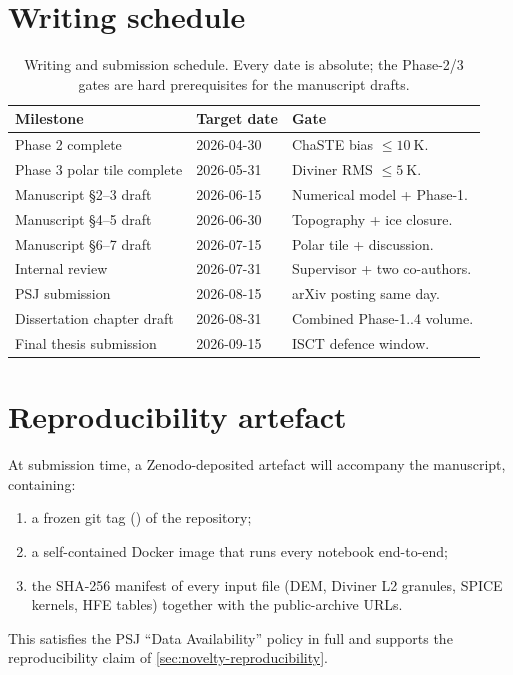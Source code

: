 \section{Writing schedule}

\begin{table}[H]
\centering
\small
\begin{tabularx}{\linewidth}{l l Y}
\toprule
Milestone & Target date & Gate \\
\midrule
Phase 2 complete             & 2026-04-30 & ChaSTE bias $\le\SI{10}{\kelvin}$. \\
Phase 3 polar tile complete  & 2026-05-31 & Diviner RMS $\le\SI{5}{\kelvin}$. \\
Manuscript \S2--3 draft      & 2026-06-15 & Numerical model + Phase-1. \\
Manuscript \S4--5 draft      & 2026-06-30 & Topography + ice closure. \\
Manuscript \S6--7 draft      & 2026-07-15 & Polar tile + discussion. \\
Internal review              & 2026-07-31 & Supervisor + two co-authors. \\
PSJ submission               & 2026-08-15 & arXiv posting same day. \\
Dissertation chapter draft   & 2026-08-31 & Combined Phase-1..4 volume. \\
Final thesis submission      & 2026-09-15 & ISCT defence window. \\
\bottomrule
\end{tabularx}
\caption{Writing and submission schedule.  Every date is absolute; the
  Phase-2/3 gates are hard prerequisites for the manuscript drafts.}
\label{tab:schedule}
\end{table}

\section{Reproducibility artefact}

At submission time, a Zenodo-deposited artefact will accompany the
manuscript, containing:
\begin{enumerate}
  \item a frozen git tag () of the
        \repo{} repository;
  \item a self-contained Docker image that runs every notebook
        end-to-end;
  \item the SHA-256 manifest of every input file (DEM, Diviner L2
        granules, SPICE kernels, HFE tables) together with the
        public-archive URLs.
\end{enumerate}
This satisfies the PSJ ``Data Availability'' policy in full and
supports the reproducibility claim of \cref{sec:novelty-reproducibility}.

